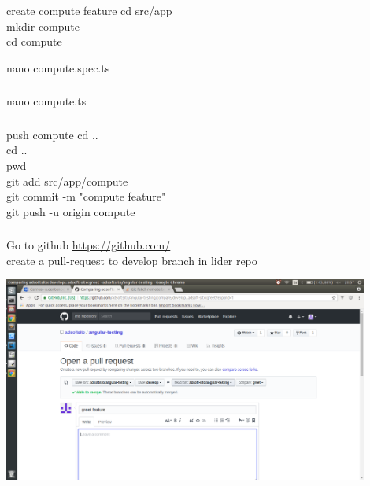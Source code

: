 \documentclass{beamer}
\begin{document}
\begin{frame}\frametitle{} 

\begin{block}{create compute feature}
cd src/app \\
mkdir compute \\
cd compute
\end{block}

\begin{block}{nano compute.spec.ts}
\lstspec
\end{block}


\end{frame}




\begin{frame}\frametitle{} 


\begin{block}{nano compute.ts}
\lstts
\end{block}

\end{frame}


\begin{frame}\frametitle{} 


\begin{block}{push compute}
cd .. \\
cd .. \\
pwd  \\
git add src/app/compute \\
git commit -m "compute feature" \\
git push -u origin compute \\
\end{block}
\end{frame}


\begin{frame}\frametitle{} 

\begin{block}{Go to github}
\url{https://github.com/} \\

create a pull-request to develop branch in lider repo
\end{block}

\begin{center}
\includegraphics[width=0.9\textwidth]{pull-request.png}
\end{center}


\end{frame}
\end{document}
